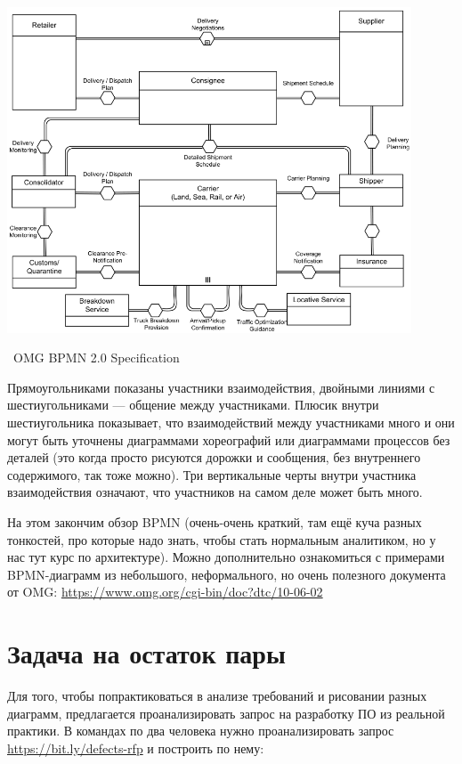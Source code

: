 \documentclass[a5paper]{article}
\newcommand{\attribution}[1] {
    \vspace{-4mm}\begin{flushright}\begin{scriptsize}%
    {\textcopyright\, #1}\end{scriptsize}\end{flushright}
}
\begin{document}
\begin{center}
    \includegraphics[width=0.9\textwidth]{bpmnConversation.png}
    \attribution{OMG BPMN 2.0 Specification}
\end{center}

Прямоугольниками показаны участники взаимодействия, двойными линиями с шестиугольниками --- общение между участниками. Плюсик внутри шестиугольника показывает, что взаимодействий между участниками много и они могут быть уточнены диаграммами хореографий или диаграммами процессов без деталей (это когда просто рисуются дорожки и сообщения, без внутреннего содержимого, так тоже можно). Три вертикальные черты внутри участника взаимодействия означают, что участников на самом деле может быть много.

На этом закончим обзор BPMN (очень-очень краткий, там ещё куча разных тонкостей, про которые надо знать, чтобы стать нормальным аналитиком, но у нас тут курс по архитектуре). Можно дополнительно ознакомиться с примерами BPMN-диаграмм из небольшого, неформального, но очень полезного документа от OMG: \url{https://www.omg.org/cgi-bin/doc?dtc/10-06-02}

\section{Задача на остаток пары}

Для того, чтобы попрактиковаться в анализе требований и рисовании разных диаграмм, предлагается проанализировать запрос на разработку ПО из реальной практики. В командах по два человека нужно проанализировать запрос \url{https://bit.ly/defects-rfp} и построить по нему:
\end{document}
